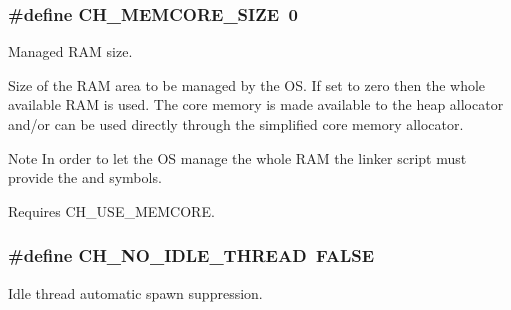 \subsubsection[{C\+H\+\_\+\+M\+E\+M\+C\+O\+R\+E\+\_\+\+S\+I\+Z\+E}]{\setlength{\rightskip}{0pt plus 5cm}\#define C\+H\+\_\+\+M\+E\+M\+C\+O\+R\+E\+\_\+\+S\+I\+Z\+E~0}\label{group__config_gac73902e3c40b375483f9dde71e83253d}


Managed R\+A\+M size. 

Size of the R\+A\+M area to be managed by the O\+S. If set to zero then the whole available R\+A\+M is used. The core memory is made available to the heap allocator and/or can be used directly through the simplified core memory allocator.

\begin{DoxyNote}{Note}
In order to let the O\+S manage the whole R\+A\+M the linker script must provide the {} and {} symbols. 

Requires {\ttfamily C\+H\+\_\+\+U\+S\+E\+\_\+\+M\+E\+M\+C\+O\+R\+E}. 
\end{DoxyNote}
\hypertarget{group__config_gac7ceed3b75958cb6f7a977aab5ee249f}{}
\subsubsection[{C\+H\+\_\+\+N\+O\+\_\+\+I\+D\+L\+E\+\_\+\+T\+H\+R\+E\+A\+D}]{\setlength{\rightskip}{0pt plus 5cm}\#define C\+H\+\_\+\+N\+O\+\_\+\+I\+D\+L\+E\+\_\+\+T\+H\+R\+E\+A\+D~F\+A\+L\+S\+E}\label{group__config_gac7ceed3b75958cb6f7a977aab5ee249f}


Idle thread automatic spawn suppression. 

